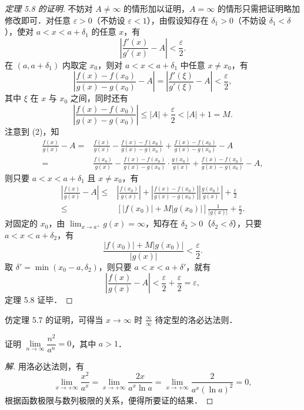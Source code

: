 \begin{proof}[定理 5.8 的证明]
不妨对 $A \neq \infty$ 的情形加以证明，$A = \infty$ 的情形只需把证明略加修改即可．对任意 $\varepsilon > 0$（不妨设 $\varepsilon < 1$），由假设知存在 $\delta_1 > 0$（不妨设 $\delta_1 < \delta$），使对 $a < x < a + \delta_1$ 的任意 $x$，有
\[
\left|\frac{f'(x)}{g'(x)} - A\right| < \frac{\varepsilon}{2}.
\]
在 $(a, a+\delta_1)$ 内取定 $x_0$，则对 $a < x < a+\delta_1$ 中任意 $x \neq x_0$，有
\[
\left|\frac{f(x) - f(x_0)}{g(x) - g(x_0)} - A\right|
= \left|\frac{f'(\xi)}{g'(\xi)} - A\right| < \frac{\varepsilon}{2},
\]
其中 $\xi$ 在 $x$ 与 $x_0$ 之间，同时还有
\[
\left|\frac{f(x) - f(x_0)}{g(x) - g(x_0)}\right|
\leqslant |A| + \frac{\varepsilon}{2} < |A| + 1 = M.
\]
注意到 (2)，知
\begin{align*}
\frac{f(x)}{g(x)} - A
={}& \frac{f(x)}{g(x)} - \frac{f(x) - f(x_0)}{g(x) - g(x_0)}
+ \frac{f(x) - f(x_0)}{g(x) - g(x_0)} - A\\
={}& \frac{f(x_0)}{g(x)} - \frac{f(x) - f(x_0)}{g(x) - g(x_0)}\cdot\frac{g(x_0)}{g(x)}
+ \frac{f(x) - f(x_0)}{g(x) - g(x_0)} - A,
\end{align*}
则只要 $a < x < a + \delta_1$ 且 $x \neq x_0$，有
\begin{align*}
\left|\frac{f(x)}{g(x)} - A\right|
\leqslant{}& \left|\frac{f(x_0)}{g(x)}\right|
+ \left|\frac{f(x) - f(x_0)}{g(x) - g(x_0)}\right|\left|\frac{g(x_0)}{g(x)}\right|
+ \frac{\varepsilon}{2}\\
\leqslant{}& \left[|f(x_0)| + M|g(x_0)|\right]\frac{1}{|g(x)|} + \frac{\varepsilon}{2}.
\end{align*}
对固定的 $x_0$，由 $\lim_{x\to a^+} g(x) = \infty$，知存在 $\delta_2 > 0$（$\delta_2 < \delta$），只要 $a < x < a + \delta_2$，有
\[
\frac{|f(x_0)| + M|g(x_0)|}{|g(x)|} < \frac{\varepsilon}{2}.
\]
取 $\delta' = \min(x_0 - a, \delta_2)$，则只要 $a < x < a + \delta'$，就有
\[
\left|\frac{f(x)}{g(x)} - A\right| < \frac{\varepsilon}{2} + \frac{\varepsilon}{2} = \varepsilon,
\]
定理 5.8 证毕．
\end{proof}

仿定理 5.7 的证明，可得当 $x \to \infty$ 时 $\frac{\infty}{\infty}$ 待定型的洛必达法则．

\begin{example}
证明 $\lim\limits_{n\to\infty}\dfrac{n^{2}}{a^{n}} = 0$，其中 $a > 1$．
\end{example}

\begin{proof}[解]
用洛必达法则，有
\[
\lim_{x\to+\infty}\frac{x^{2}}{a^{x}}
= \lim_{x\to+\infty}\frac{2x}{a^{x}\ln a}
= \lim_{x\to+\infty}\frac{2}{a^{x}(\ln a)^{2}} = 0,
\]
根据函数极限与数列极限的关系，便得所要证的结果．
\end{proof}

